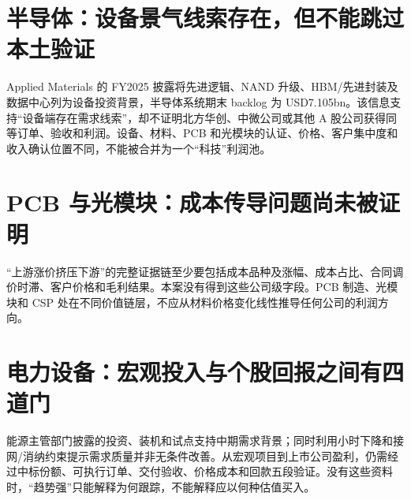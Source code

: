 \section{半导体：设备景气线索存在，但不能跳过本土验证}
Applied Materials 的 FY2025 披露将先进逻辑、NAND 升级、HBM/先进封装及数据中心列为设备投资背景，半导体系统期末 backlog 为 USD7.105bn。该信息支持“设备端存在需求线索”，却不证明北方华创、中微公司或其他 A 股公司获得同等订单、验收和利润。设备、材料、PCB 和光模块的认证、价格、客户集中度和收入确认位置不同，不能被合并为一个“科技”利润池。

\section{PCB 与光模块：成本传导问题尚未被证明}
“上游涨价挤压下游”的完整证据链至少要包括成本品种及涨幅、成本占比、合同调价时滞、客户价格和毛利结果。本案没有得到这些公司级字段。PCB 制造、光模块和 CSP 处在不同价值链层，不应从材料价格变化线性推导任何公司的利润方向。

\section{电力设备：宏观投入与个股回报之间有四道门}
能源主管部门披露的投资、装机和试点支持中期需求背景；同时利用小时下降和接网/消纳约束提示需求质量并非无条件改善。从宏观项目到上市公司盈利，仍需经过中标份额、可执行订单、交付验收、价格成本和回款五段验证。没有这些资料时，“趋势强”只能解释为何跟踪，不能解释应以何种估值买入。
